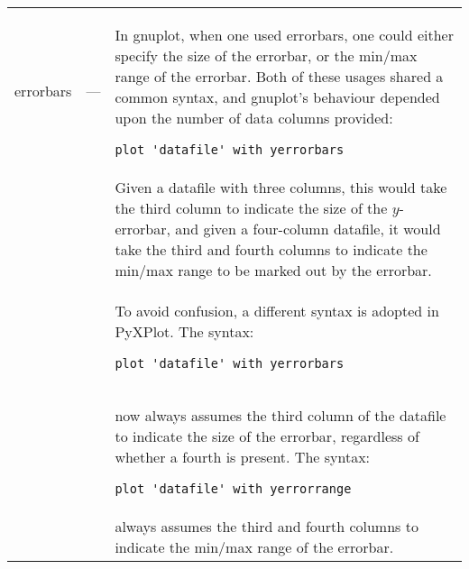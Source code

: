 \documentclass[a4paper,onecolumn,11pt]{book}
\begin{document}
\begin{longtable}{p{3cm}lp{9cm}}
errorbars\index{errorbars}\label{errorbars} & --- & In gnuplot, when one used
errorbars, one could either specify the size of the errorbar, or the min/max
range of the errorbar. Both of these usages shared a common syntax, and
gnuplot's behaviour depended upon the number of data columns provided:

\begin{verbatim}
plot 'datafile' with yerrorbars
\end{verbatim}
\\ & &
\noindent Given a datafile with three columns, this would take the third column
to indicate the size of the $y$-errorbar, and given a four-column datafile, it
would take the third and fourth columns to indicate the min/max range to be
marked out by the errorbar.
\\ & &
To avoid confusion, a different syntax is adopted in PyXPlot. The syntax:

\begin{verbatim}
plot 'datafile' with yerrorbars
\end{verbatim}
\\ & &
\noindent now always assumes the third column of the datafile to indicate the
size of the errorbar, regardless of whether a fourth is present. The syntax:

\begin{verbatim}
plot 'datafile' with yerrorrange
\end{verbatim}
\\ & &
\noindent always assumes the third and fourth columns to indicate the min/max
range of the errorbar.


\end{longtable}
\end{document}
